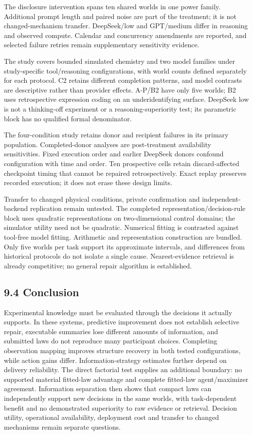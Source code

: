 \documentclass[10pt,twocolumn]{article}
\begin{document}
The disclosure intervention spans ten shared worlds in one power family.
Additional prompt length and paired noise are part of the treatment; it
is not changed-mechanism transfer. DeepSeek/low and GPT/medium differ in
reasoning and observed compute. Calendar and concurrency amendments are
reported, and selected failure retries remain supplementary sensitivity
evidence.

The study covers bounded simulated chemistry and two model families
under study-specific tool/reasoning configurations, with world counts
defined separately for each protocol. C2 retains different completion
patterns, and model contrasts are descriptive rather than provider
effects. A-P/B2 have only five worlds; B2 uses retrospective expression
coding on an underidentifying surface. DeepSeek low is not a
thinking-off experiment or a reasoning-superiority test; its parametric
block has no qualified formal denominator.

The four-condition study retains donor and recipient failures in its
primary population. Completed-donor analyses are post-treatment
availability sensitivities. Fixed execution order and earlier DeepSeek
donors confound configuration with time and order. Ten prospective cells
retain discard-affected checkpoint timing that cannot be repaired
retrospectively. Exact replay preserves recorded execution; it does not
erase these design limits.

Transfer to changed physical conditions, private confirmation and
independent-backend replication remain untested. The completed
representation/decision-rule block uses quadratic representations on
two-dimensional control domains; the simulator utility need not be
quadratic. Numerical fitting is contrasted against tool-free model
fitting. Arithmetic and representation construction are bundled. Only
five worlds per task support its approximate intervals, and differences
from historical protocols do not isolate a single cause.
Nearest-evidence retrieval is already competitive; no general repair
algorithm is established.

\subsection{9.4 Conclusion}\label{conclusion}

Experimental knowledge must be evaluated through the decisions it
actually supports. In these systems, predictive improvement does not
establish selective repair, executable summaries lose different amounts
of information, and submitted laws do not reproduce many participant
choices. Completing observation mapping improves structure recovery in
both tested configurations, while action gains differ.
Information-strategy estimates further depend on delivery reliability.
The direct factorial test supplies an additional boundary: no supported
material fitted-law advantage and complete fitted-law agent/maximizer
agreement. Information separation then shows that compact laws can
independently support new decisions in the same worlds, with
task-dependent benefit and no demonstrated superiority to raw evidence
or retrieval. Decision utility, operational availability, deployment
cost and transfer to changed mechanisms remain separate questions.
\end{document}
